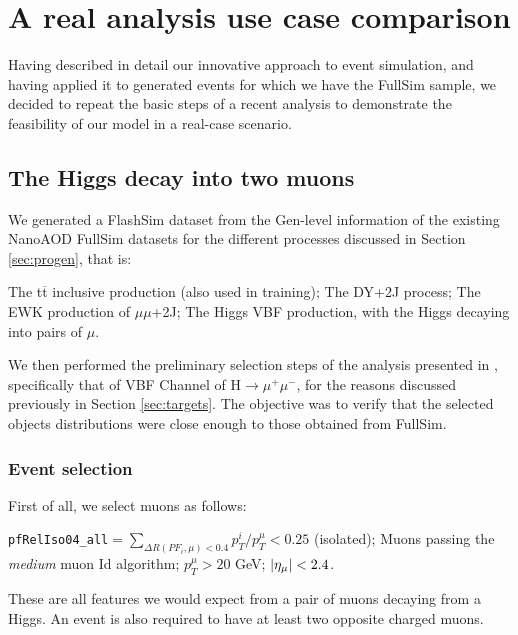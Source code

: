 \chapter{A real analysis use case comparison}\label{ch:benan} %
Having described in detail our innovative approach to event simulation, and having applied it to generated events for which we have the FullSim sample, we decided to repeat the basic steps of a recent analysis to demonstrate the feasibility of our model in a real-case scenario.

\section{The Higgs decay into two muons}
We generated a FlashSim dataset from the Gen-level information of the existing NanoAOD FullSim datasets for the different processes discussed in Section \ref{sec:progen}, that is:

\begin{outline}
\1 The t$\overline{\text{t}}$ inclusive production (also used in training);
\1 The DY+2J process;
\1 The EWK production of $\mu\mu$+2J;
\1 The Higgs VBF production, with the Higgs decaying into pairs of $\mu$.
\end{outline}

We then performed the preliminary selection steps of the analysis presented in \cite{Sirunyan_2021}, specifically that of VBF Channel of H$\rightarrow\mu^+\mu^-$, for the reasons discussed previously in Section \ref{sec:targets}.
The objective was to verify that the selected objects distributions were close enough to those obtained from FullSim.

\subsection{Event selection}

First of all, we select muons as follows:
\begin{outline}
\1 \texttt{pfRelIso04\_all}$= \sum_{\Delta R(PF_i, \mu)<0.4}p_T^i/p_T^{\mu}<0.25$ (isolated);
\1  Muons passing the \emph{medium} muon Id algorithm;
\1  $p_T^{\mu}>20$ GeV;
\1  $\abs{\eta_{\mu}}<2.4$.
\end{outline}

These are all features we would expect from a pair of muons decaying from a Higgs. An event is also required to have at least two opposite charged muons.

